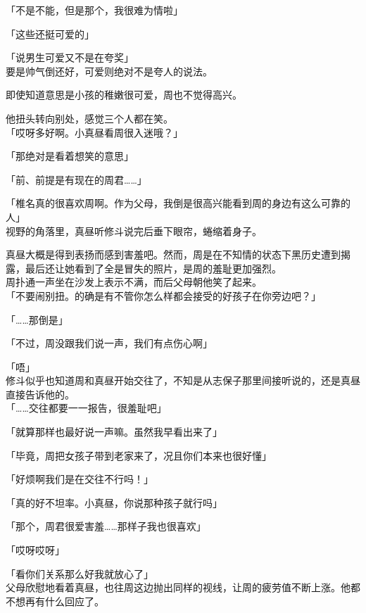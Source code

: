 「不是不能，但是那个，我很难为情啦」

「这些还挺可爱的」

「说男生可爱又不是在夸奖」\\

要是帅气倒还好，可爱则绝对不是夸人的说法。

即使知道意思是小孩的稚嫩很可爱，周也不觉得高兴。

他扭头转向别处，感觉三个人都在笑。\\

「哎呀多好啊。小真昼看周很入迷哦？」

「那绝对是看着想笑的意思」

「前、前提是有现在的周君……」

「椎名真的很喜欢周啊。作为父母，我倒是很高兴能看到周的身边有这么可靠的人」\\

视野的角落里，真昼听修斗说完后垂下眼帘，蜷缩着身子。

真昼大概是得到表扬而感到害羞吧。然而，周是在不知情的状态下黑历史遭到揭露，最后还让她看到了全是冒失的照片，是周的羞耻更加强烈。\\

周扑通一声坐在沙发上表示不满，而后父母朝他笑了起来。\\

「不要闹别扭。的确是有不管你怎么样都会接受的好孩子在你旁边吧？」

「……那倒是」

「不过，周没跟我们说一声，我们有点伤心啊」

「唔」\\

修斗似乎也知道周和真昼开始交往了，不知是从志保子那里间接听说的，还是真昼直接告诉他的。\\

「……交往都要一一报告，很羞耻吧」

「就算那样也最好说一声嘛。虽然我早看出来了」

「毕竟，周把女孩子带到老家来了，况且你们本来也很好懂」

「好烦啊我们是在交往不行吗！」

「真的好不坦率。小真昼，你说那种孩子就行吗」

「那个，周君很爱害羞……那样子我也很喜欢」

「哎呀哎呀」

「看你们关系那么好我就放心了」\\

父母欣慰地看着真昼，也往周这边抛出同样的视线，让周的疲劳值不断上涨。他都不想再有什么回应了。\\

